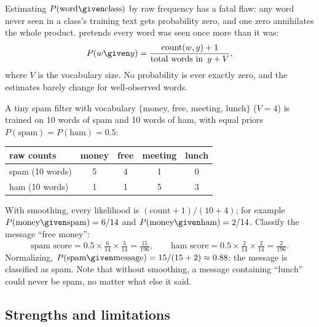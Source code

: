 Estimating $P(\text{word}\given\text{class})$ by raw frequency has a fatal flaw: any word never seen in a class's training text gets probability zero, and one zero annihilates the whole product.  pretends every word was seen once more than it was:
\[
  P(w\given y)
  =\frac{\operatorname{count}(w,y)+1}
        {\operatorname{total\ words\ in\ }y+V},
\]
where $V$ is the vocabulary size. No probability is ever exactly zero, and the estimates barely change for well-observed words.

\begin{workedexample}
A tiny spam filter with vocabulary $\{$money, free, meeting, lunch$\}$ ($V=4$) is trained on 10 words of spam and 10 words of ham, with equal priors $P(\text{spam})=P(\text{ham})=0.5$:

\begin{mltable}
\begin{tabular}{@{}lcccc@{}}
\toprule
\rowcolor{MLPaleBlue!92}
raw counts & money & free & meeting & lunch \\
\midrule
spam (10 words) & 5 & 4 & 1 & 0 \\
ham (10 words) & 1 & 1 & 5 & 3 \\
\bottomrule
\end{tabular}
\end{mltable}

With smoothing, every likelihood is $(\text{count}+1)/(10+4)$; for example $P(\text{money}\given\text{spam})=6/14$ and $P(\text{money}\given\text{ham})=2/14$. Classify the message ``free money'':
\[
  \text{spam score}=0.5\times\tfrac{6}{14}\times\tfrac{5}{14}
  =\tfrac{15}{196},
  \qquad
  \text{ham score}=0.5\times\tfrac{2}{14}\times\tfrac{2}{14}
  =\tfrac{2}{196}.
\]
Normalizing, $P(\text{spam}\given\text{message})=15/(15+2)\approx 0.88$: the message is classified as spam. Note that without smoothing, a message containing ``lunch'' could never be spam, no matter what else it said.
\end{workedexample}

\subsection{Strengths and limitations}

